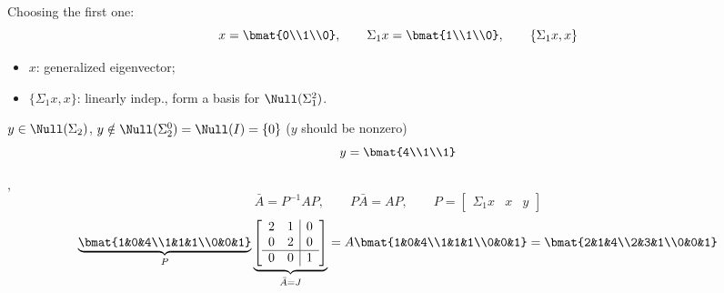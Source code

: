 \begin{example}
Choosing the first one:
\[
x=\bmat{0\\1\\0},\qquad \Sigma_1x=\bmat{1\\1\\0},\qquad \{\Sigma_1 x, x\}
\]
\begin{itemize}[noitemsep]
\item $x$: generalized eigenvector; \quad {}
\item $\{\Sigma_1x,x\}$: linearly indep., form a basis for $\Null(\Sigma_1^2)$.
\end{itemize}

\begin{minipage}[c]{0.2\textwidth}
\centering
{}
\end{minipage}\hfill
\begin{minipage}[c]{0.76\textwidth}
$y\in\Null(\Sigma_2)$, \quad $y\notin\Null(\Sigma_2^0)=\Null(I)=\{0\}$ \quad ($y$ should be nonzero)
\[
y=\bmat{4\\1\\1}
\]
\end{minipage}

\sep
\[
\bar A=P^{-1}AP,\qquad P\bar A=AP,\qquad P=\left[\begin{array}{cc|c}\Sigma_1x & x & y\end{array}\right]
\]
\[
\underbrace{\bmat{1&0&4\\1&1&1\\0&0&1}}_{P}
\underbrace{\left[\begin{array}{cc|c}2&1&0\\0&2&0\\\hline 0&0&1\end{array}\right]}_{\bar A=J}
=A\bmat{1&0&4\\1&1&1\\0&0&1}=\bmat{2&1&4\\2&3&1\\0&0&1}
\]


\end{example}
